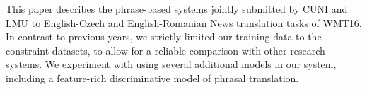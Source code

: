 This paper describes the phrase-based systems jointly submitted by CUNI and LMU to English-Czech and English-Romanian News translation tasks of WMT16. In contrast to previous years, we strictly limited our training data to the constraint datasets, to allow for a reliable comparison with other research systems. We experiment with using several additional models in our system, including a feature-rich discriminative model of phrasal translation.
